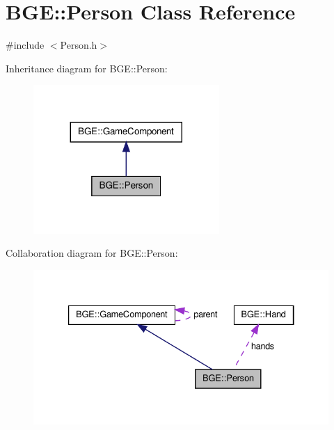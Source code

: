 \hypertarget{class_b_g_e_1_1_person}{\section{B\-G\-E\-:\-:Person Class Reference}
\label{class_b_g_e_1_1_person}
}


{\ttfamily \#include $<$Person.\-h$>$}



Inheritance diagram for B\-G\-E\-:\-:Person\-:
\nopagebreak
\begin{figure}[H]
\begin{center}
\leavevmode
\includegraphics[width=200pt]{class_b_g_e_1_1_person__inherit__graph}
\end{center}
\end{figure}


Collaboration diagram for B\-G\-E\-:\-:Person\-:
\nopagebreak
\begin{figure}[H]
\begin{center}
\leavevmode
\includegraphics[width=333pt]{class_b_g_e_1_1_person__coll__graph}
\end{center}
\end{figure}
